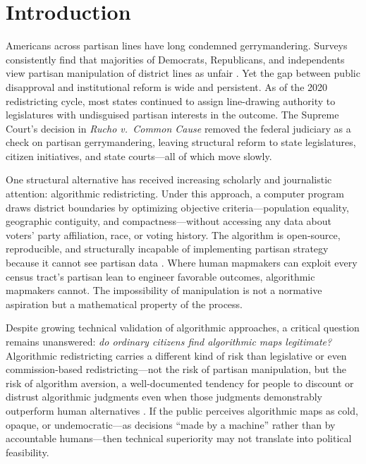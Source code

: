 \section{Introduction}
\label{sec:introduction}

Americans across partisan lines have long condemned gerrymandering. Surveys consistently find that majorities of Democrats, Republicans, and independents view partisan manipulation of district lines as unfair \citep{pew2017redistricting,gallup2019gerrymander}. Yet the gap between public disapproval and institutional reform is wide and persistent. As of the 2020 redistricting cycle, most states continued to assign line-drawing authority to legislatures with undisguised partisan interests in the outcome. The Supreme Court's decision in \textit{Rucho v.\ Common Cause} \citeyearpar{rucho2019} removed the federal judiciary as a check on partisan gerrymandering, leaving structural reform to state legislatures, citizen initiatives, and state courts---all of which move slowly.

One structural alternative has received increasing scholarly and journalistic attention: algorithmic redistricting. Under this approach, a computer program draws district boundaries by optimizing objective criteria---population equality, geographic contiguity, and compactness---without accessing any data about voters' party affiliation, race, or voting history. The algorithm is open-source, reproducible, and structurally incapable of implementing partisan strategy because it cannot see partisan data \citep{dellaLibera2026recursive}. Where human mapmakers can exploit every census tract's partisan lean to engineer favorable outcomes, algorithmic mapmakers cannot. The impossibility of manipulation is not a normative aspiration but a mathematical property of the process.

Despite growing technical validation of algorithmic approaches, a critical question remains unanswered: \textit{do ordinary citizens find algorithmic maps legitimate?} Algorithmic redistricting carries a different kind of risk than legislative or even commission-based redistricting---not the risk of partisan manipulation, but the risk of algorithm aversion, a well-documented tendency for people to discount or distrust algorithmic judgments even when those judgments demonstrably outperform human alternatives \citep{dietvorst2015algorithm}. If the public perceives algorithmic maps as cold, opaque, or undemocratic---as decisions ``made by a machine'' rather than by accountable humans---then technical superiority may not translate into political feasibility.

